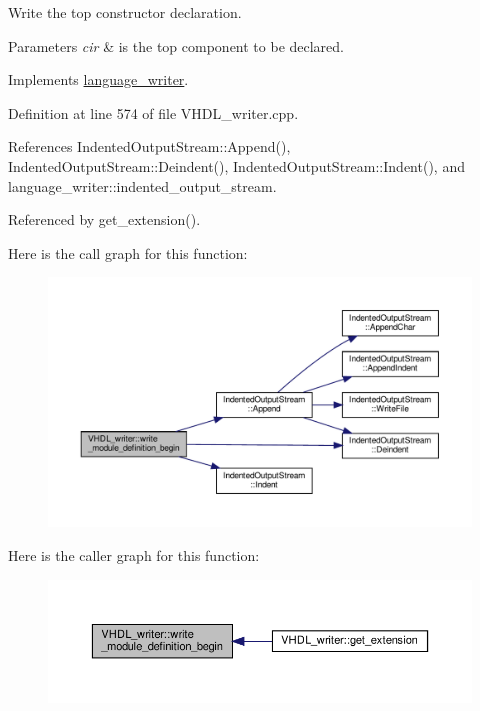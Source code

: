Write the top constructor declaration. 


\begin{DoxyParams}{Parameters}
{\em cir} & is the top component to be declared. \\
\hline
\end{DoxyParams}


Implements \hyperlink{classlanguage__writer_a53b7db2b1ad81b2ee89ff81705b0f0ff}{language\+\_\+writer}.



Definition at line 574 of file V\+H\+D\+L\+\_\+writer.\+cpp.



References Indented\+Output\+Stream\+::\+Append(), Indented\+Output\+Stream\+::\+Deindent(), Indented\+Output\+Stream\+::\+Indent(), and language\+\_\+writer\+::indented\+\_\+output\+\_\+stream.



Referenced by get\+\_\+extension().

Here is the call graph for this function\+:
\nopagebreak
\begin{figure}[H]
\begin{center}
\leavevmode
\includegraphics[width=350pt]{d0/d0c/structVHDL__writer_a36282fe093991df0bd1b5c1df8466fd6_cgraph}
\end{center}
\end{figure}
Here is the caller graph for this function\+:
\nopagebreak
\begin{figure}[H]
\begin{center}
\leavevmode
\includegraphics[width=350pt]{d0/d0c/structVHDL__writer_a36282fe093991df0bd1b5c1df8466fd6_icgraph}
\end{center}
\end{figure}
\mbox{\label{structVHDL__writer_af09ad7bcc11cb6cbcc0d92957db60283}} 
